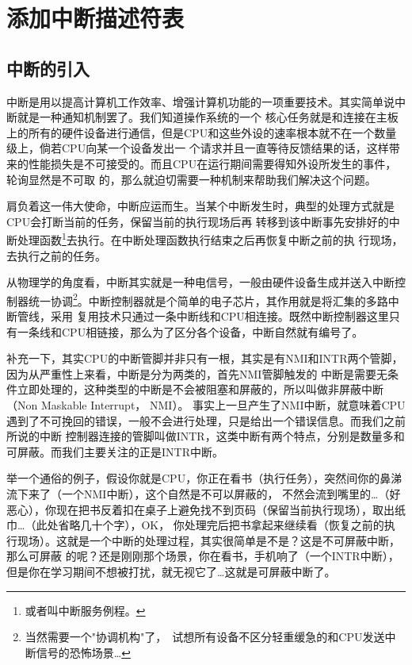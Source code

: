 
\section {添加中断描述符表}

\subsection{中断的引入}

\par 中断是用以提高计算机工作效率、增强计算机功能的一项重要技术。其实简单说中断就是一种通知机制罢了。我们知道操作系统的一个\allowbreak
核心任务就是和连接在主板上的所有的硬件设备进行通信，但是CPU和这些外设的速率根本就不在一个数量级上，倘若CPU向某一个设备发出一\allowbreak
个请求并且一直等待反馈结果的话，这样带来的性能损失是不可接受的。而且CPU在运行期间需要得知外设所发生的事件，轮询显然是不可取\allowbreak
的，那么就迫切需要一种机制来帮助我们解决这个问题。

\par 肩负着这一伟大使命，中断应运而生。当某个中断发生时，典型的处理方式就是CPU会打断当前的任务，保留当前的执行现场后再\allowbreak
转移到该中断事先安排好的中断处理函数\footnote{或者叫中断服务例程。}去执行。在中断处理函数执行结束之后再恢复中断之前的执\allowbreak
行现场，去执行之前的任务。

\par 从物理学的角度看，中断其实就是一种电信号，一般由硬件设备生成并送入中断控制器统一协调\footnote{当然需要一个"协调机构"了，\allowbreak\
试想所有设备不区分轻重缓急的和CPU发送中断信号的恐怖场景…}。中断控制器就是个简单的电子芯片，其作用就是将汇集的多路中断管线，采用\allowbreak
复用技术只通过一条中断线和CPU相连接。既然中断控制器这里只有一条线和CPU相链接，那么为了区分各个设备，中断自然就有编号了。

\par 补充一下，其实CPU的中断管脚并非只有一根，其实是有NMI和INTR两个管脚，因为从严重性上来看，中断是分为两类的，首先NMI管脚触发的\allowbreak
中断是需要无条件立即处理的，这种类型的中断是不会被阻塞和屏蔽的，所以叫做非屏蔽中断（Non Maskable Interrupt， NMI）。\allowbreak
事实上一旦产生了NMI中断，就意味着CPU遇到了不可挽回的错误，一般不会进行处理，只是给出一个错误信息。而我们之前所说的中断\allowbreak
控制器连接的管脚叫做INTR，这类中断有两个特点，分别是数量多和可屏蔽。而我们主要关注的正是INTR中断。

\par 举一个通俗的例子，假设你就是CPU，你正在看书（执行任务），突然间你的鼻涕流下来了（一个NMI中断），这个自然是不可以屏蔽的，\allowbreak
不然会流到嘴里的…（好恶心），你现在把书反着扣在桌子上避免找不到页码（保留当前执行现场），取出纸巾…（此处省略几十个字），OK，\allowbreak
你处理完后把书拿起来继续看（恢复之前的执行现场）。这就是一个中断的处理过程，其实很简单是不是？这是不可屏蔽中断，那么可屏蔽\allowbreak
的呢？还是刚刚那个场景，你在看书，手机响了（一个INTR中断），但是你在学习期间不想被打扰，就无视它了…这就是可屏蔽中断了。

